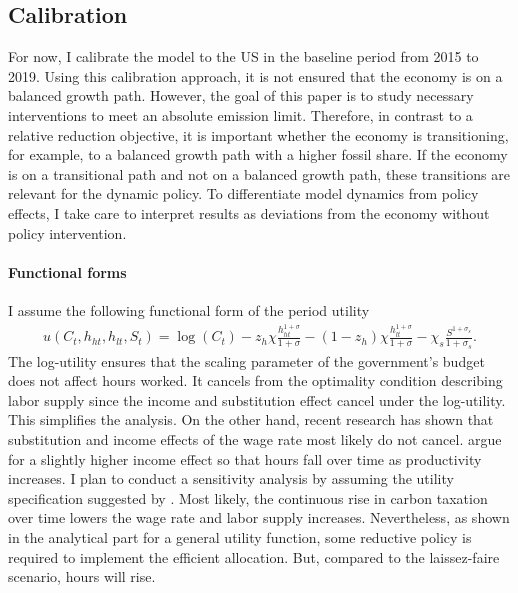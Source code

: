 \subsection{Calibration}\label{subsec:calib}


For now, I calibrate the model to the US in the baseline period from 2015 to 2019. Using this calibration approach, it is not ensured that the economy is on a balanced growth path. However, the goal of this paper is to study necessary interventions to meet an absolute emission limit. Therefore, in contrast to a relative reduction objective, it is important whether the economy is transitioning, for example, to a balanced growth path with a higher fossil share. If the economy is on a transitional path and not on a balanced growth path, these transitions are relevant for the dynamic policy. 
 To differentiate model dynamics from policy effects, I take care to interpret results as deviations from the economy without policy intervention. 




\paragraph{Functional forms} I assume the following functional form of the period utility
\begin{align}
u(C_t,h_{ht}, h_{lt}, S_t )= \log(C_t)-z_h\chi\frac{h_{ht}^{1+\sigma}}{{1+\sigma}}-(1-z_h)\chi\frac{h_{lt}^{1+\sigma}}{{1+\sigma}}-\chi_s\frac{S^{1+\sigma_s}}{1+\sigma_s}.
\end{align}
The log-utility ensures that the scaling parameter of the government's budget does not affect hours worked. It cancels from the optimality condition describing labor supply since the income and substitution effect cancel under the log-utility. 
This simplifies the analysis. On the other hand, recent research has shown that substitution and income effects of the wage rate most likely do not cancel. \cite{Boppart2019LaborPerspectiveb} argue for a slightly higher income effect so that hours fall over time as productivity increases. I plan to conduct a sensitivity analysis by assuming the utility specification suggested by \cite{Boppart2019LaborPerspectiveb}. Most likely, the continuous rise in carbon taxation over time lowers the wage rate and labor supply increases. Nevertheless, as shown in the analytical part for a general utility function, some reductive policy is required to implement the efficient allocation. But, compared to the laissez-faire scenario, hours will rise. 

